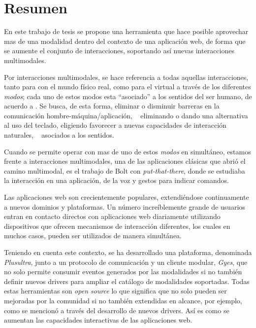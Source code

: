 

\begingroup
\let\clearpage\relax
\let\cleardoublepage\relax
\let\cleardoublepage\relax

\chapter*{Resumen} %
En este trabajo de tesis se propone una herramienta que hace posible aprovechar mas de una modalidad dentro del contexto de una aplicación web, de forma que se aumente el conjunto de interacciones, soportando así nuevas interacciones multimodales.

Por interacciones multimodales, se hace referencia a todas aquellas interacciones, tanto para con el mundo físico real, como para el virtual a través de los diferentes \emph{modos}; cada uno de estos modos esta ``asociado'' a los sentidos del ser humano, de acuerdo a \citet{Bourguet2003}. Se busca, de esta forma, eliminar o disminuir barreras en la comunicación hombre-máquina/aplicación, \eg~ eliminando o dando una alternativa al uso del teclado, eligiendo favorecer a nuevas capacidades de interacción naturales, \ie~ asociados a los sentidos.

Cuando se permite operar con mas de uno de estos \emph{modos} en simultáneo, estamos frente a interacciones multimodales, una de las aplicaciones clásicas que abrió el camino multimodal, es el trabajo de Bolt \citep{bolt1980put} con \emph{put-that-there}, donde se estudiaba la interacción en una aplicación, de la voz y gestos para indicar comandos.

Las aplicaciones web son crecientemente populares, extendiéndose continuamente a nuevos dominios y plataformas. Un número increíblemente grande de usuarios entran en contacto directos con aplicaciones web diariamente utilizando dispositivos que ofrecen mecanismos de interacción diferentes, los cuales en muchos casos, pueden ser utilizados de manera simultánea.

Teniendo en cuenta este contexto, se ha desarrollado una plataforma, denominada \emph{Plusultra}, junto a un protocolo de comunicación y un cliente modular, \emph{Gyes}, que no solo permite consumir eventos generados por las modalidades si no también definir nuevos drivers para ampliar el catálogo de modalidades soportadas. Todas estas herramientas son \emph{open source} lo que significa que no solo pueden ser mejoradas por la comunidad si no también extendidas en alcance, por ejemplo, como se mencionó a través del desarrollo de nuevos drivers. Así es como se aumentan las capacidades interactivas de las aplicaciones web.

